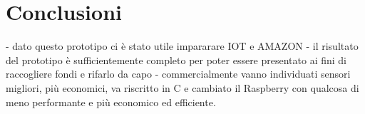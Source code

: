 \section{Conclusioni}

- dato questo prototipo ci è stato utile impararare IOT e AMAZON
- il risultato del prototipo è sufficientemente completo per poter essere presentato ai fini di raccogliere fondi e rifarlo da capo
- commercialmente vanno individuati sensori migliori, più economici, va riscritto in C e cambiato il Raspberry con qualcosa di meno performante e più economico ed efficiente.